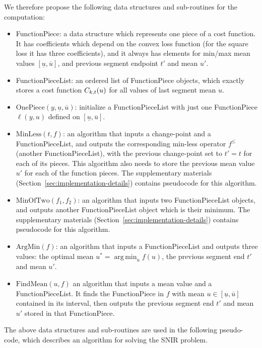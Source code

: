 \documentclass{article}
\DeclareMathOperator*{\argmin}{arg\,min}
\begin{document}
We therefore propose the following data structures and sub-routines for
the computation:
\begin{itemize}
\item FunctionPiece: a data structure which represents one piece of a
  cost function. It has coefficients which depend on the convex loss
  function (for the square loss it has three coefficients), and it
  always has elements for min/max mean values
  $[\underline u, \overline u]$, and previous segment endpoint $t'$
  and mean $u'$.
\item FunctionPieceList: an ordered list of FunctionPiece objects,
  which exactly stores a cost function $C_{k,t}(u)$ for all values
  of last segment mean $u$.
\item $\text{OnePiece}(y, \underline u, \overline u)$: initialize a
  FunctionPieceList with just one FunctionPiece $\ell(y, u)$ defined
  on $[\underline u, \overline u]$.
\item $\text{MinLess}(t, f)$: an algorithm that inputs a change-point
  and a FunctionPieceList, and outputs the corresponding min-less
  operator $f^\leq$ (another FunctionPieceList), with the previous
  change-point set to $t'=t$ for each of its pieces. This algorithm
  also needs to store the previous mean value $u'$ for each of the
  function pieces. The supplementary materials
  (Section~\ref{sec:implementation-details}) contains
  pseudocode for this algorithm.
\item $\text{MinOfTwo} (f_1, f_2)$: an algorithm that inputs two
  FunctionPieceList objects, and outputs another FunctionPieceList
  object which is their minimum. The supplementary materials
  (Section~\ref{sec:implementation-details}) contains
  pseudocode for this algorithm.
\item $\text{ArgMin}(f)$: an algorithm that inputs a FunctionPieceList
  and outputs three values: the optimal mean $u^*=\argmin_u f(u)$, the
  previous segment end $t'$ and mean $u'$.
\item $\text{FindMean}(u, f)$ an algorithm that inputs a mean value
  and a FunctionPieceList. It finds the FunctionPiece in $f$ with mean
  $u\in[\underline u, \overline u]$ contained in its interval, then
  outputs the previous segment end $t'$ and mean $u'$ stored in that
  FunctionPiece.
\end{itemize}
The above data structures and sub-routines are used in the following
pseudo-code, which describes an algorithm for solving the SNIR
problem.
\end{document}
